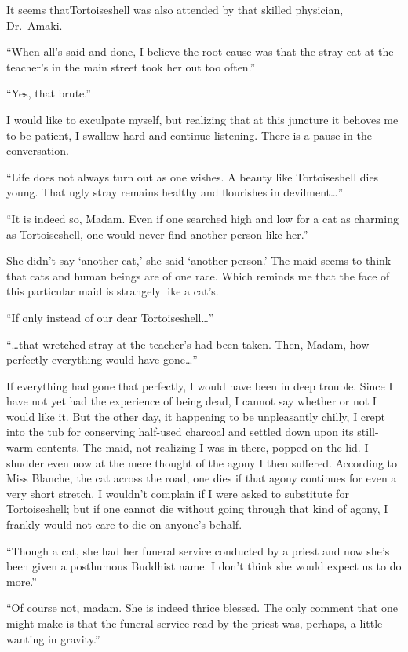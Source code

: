 \documentclass[12pt, openright]{book}
\begin{document}
It seems thatTortoiseshell was also attended by that skilled physician,
Dr.~Amaki.

``When all's said and done, I believe the root cause was that the stray
cat at the teacher's in the main street took her out too often.''

``Yes, that brute.''

I would like to exculpate myself, but realizing that at this juncture it
behoves me to be patient, I swallow hard and continue listening. There
is a pause in the conversation.

``Life does not always turn out as one wishes. A beauty like
Tortoiseshell dies young. That ugly stray remains healthy and flourishes
in devilment\ldots{}''

``It is indeed so, Madam. Even if one searched high and low for a cat as
charming as Tortoiseshell, one would never find another person like
her.''

She didn't say `another cat,' she said `another person.' The maid seems
to think that cats and human beings are of one race. Which reminds me
that the face of this particular maid is strangely like a cat's.

``If only instead of our dear Tortoiseshell\ldots{}''

``\ldots{}that wretched stray at the teacher's had been taken. Then,
Madam, how perfectly everything would have gone\ldots{}''

If everything had gone that perfectly, I would have been in deep
trouble. Since I have not yet had the experience of being dead, I cannot
say whether or not I would like it. But the other day, it happening to
be unpleasantly chilly, I crept into the tub for conserving half-used
charcoal and settled down upon its still-warm contents. The maid, not
realizing I was in there, popped on the lid. I shudder even now at the
mere thought of the agony I then suffered. According to Miss Blanche,
the cat across the road, one dies if that agony continues for even a
very short stretch. I wouldn't complain if I were asked to substitute
for Tortoiseshell; but if one cannot die without going through that kind
of agony, I frankly would not care to die on anyone's behalf.

``Though a cat, she had her funeral service conducted by a priest and
now she's been given a posthumous Buddhist name. I don't think she would
expect us to do more.''

``Of course not, madam. She is indeed thrice blessed. The only comment
that one might make is that the funeral service read by the priest was,
perhaps, a little wanting in gravity.''
\end{document}

